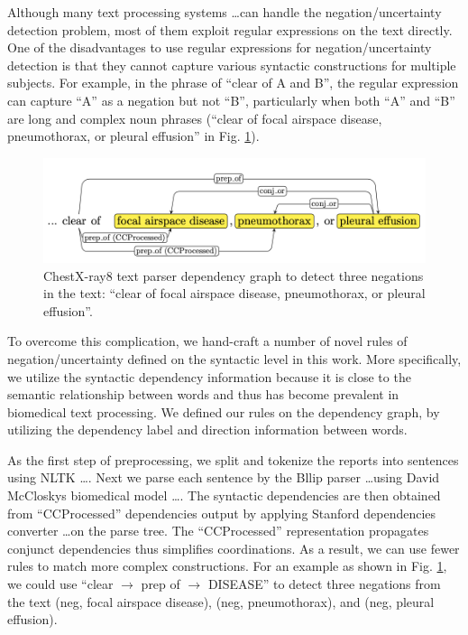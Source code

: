 \begin{singlespace}
{{Although many text processing systems \ldots can handle the negation/uncertainty detection problem, most of them exploit regular expressions on the text directly. One of the disadvantages to use regular expressions for negation/uncertainty detection is that they cannot capture various syntactic constructions for multiple subjects. For example, in the phrase of “clear of A and B”, the regular expression can capture “A” as a negation but not “B”, particularly when both “A” and “B” are long and complex noun phrases (“clear of focal airspace disease, pneumothorax, or pleural effusion” in Fig. \ref{fig:chestX-ray8-figure-3}).

\begin{figure}[!htb]
    \centering
    \includegraphics[width=0.9\columnwidth]{figures/chestX-ray8-figure-3.png}
    \caption[ChestX-ray8 text parser negation detection example.]{ChestX-ray8 text parser dependency graph to detect three negations in the text: “clear of focal airspace disease, pneumothorax, or pleural effusion”. \cite{Wang2017}}
    \label{fig:chestX-ray8-figure-3}
\end{figure}

To overcome this complication, we hand-craft a number of novel rules of negation/uncertainty defined on the syntactic level in this work. More specifically, we utilize the syntactic dependency information because it is close to the semantic relationship between words and thus has become prevalent in biomedical text processing. We defined our rules on the dependency graph, by utilizing the dependency label and direction information between words.

As the first step of preprocessing, we split and tokenize the reports into sentences using NLTK \ldots. Next we parse each sentence by the Bllip parser \ldots using David McCloskys biomedical model \ldots. The syntactic dependencies are then obtained from “CCProcessed” dependencies output by applying Stanford dependencies converter \ldots on the parse tree. The “CCProcessed” representation propagates conjunct dependencies thus simplifies coordinations. As a result, we can use fewer rules to match more complex constructions. For an example as shown in Fig. \ref{fig:chestX-ray8-figure-3}, we could use “clear $\rightarrow$ prep of $\rightarrow$ DISEASE” to detect three negations from the text (neg, focal airspace disease), (neg, pneumothorax), and (neg, pleural effusion).

}}
\end{singlespace}

